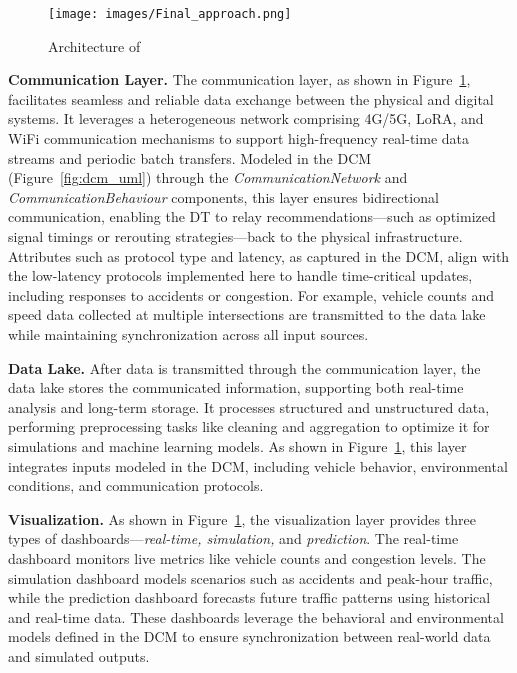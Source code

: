 \begin{figure}[!htbp]
    \centering
    \texttt{[image: images/Final\_approach.png]}
    \caption{Architecture of \digit}
    \label{fig:digit_architecture}
\end{figure}

\textbf{Communication Layer.}  
The communication layer, as shown in Figure~\ref{fig:digit_architecture}, facilitates seamless and reliable data exchange between the physical and digital systems. It leverages a heterogeneous network comprising 4G/5G, LoRA, and WiFi communication mechanisms to support high-frequency real-time data streams and periodic batch transfers. Modeled in the DCM (Figure~\ref{fig:dcm_uml}) through the \textit{CommunicationNetwork} and \textit{CommunicationBehaviour} components, this layer ensures bidirectional communication, enabling the DT to relay recommendations—such as optimized signal timings or rerouting strategies—back to the physical infrastructure. Attributes such as protocol type and latency, as captured in the DCM, align with the low-latency protocols implemented here to handle time-critical updates, including responses to accidents or congestion. For example, vehicle counts and speed data collected at multiple intersections are transmitted to the data lake while maintaining synchronization across all input sources.



\textbf{Data Lake.}  
After data is transmitted through the communication layer, the data lake stores the communicated information, supporting both real-time analysis and long-term storage. It processes structured and unstructured data, performing preprocessing tasks like cleaning and aggregation to optimize it for simulations and machine learning models. As shown in Figure~\ref{fig:digit_architecture}, this layer integrates inputs modeled in the DCM, including vehicle behavior, environmental conditions, and communication protocols. 


\textbf{Visualization.}  
As shown in Figure~\ref{fig:digit_architecture}, the visualization layer provides three types of dashboards—\textit{real-time, simulation,} and \textit{prediction}. The real-time dashboard monitors live metrics like vehicle counts and congestion levels. The simulation dashboard models scenarios such as accidents and peak-hour traffic, while the prediction dashboard forecasts future traffic patterns using historical and real-time data. These dashboards leverage the behavioral and environmental models defined in the DCM to ensure synchronization between real-world data and simulated outputs.



